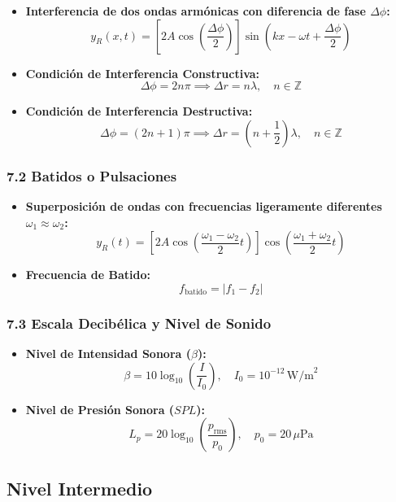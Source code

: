 \documentclass[11pt,a4paper]{article}
\begin{document}
\begin{itemize}
  \item \textbf{Interferencia de dos ondas armónicas con diferencia de fase $\Delta\phi$:}
  \[
    y_R(x, t) = \left[ 2A \cos\left(\frac{\Delta\phi}{2}\right) \right] \sin\left(kx - \omega t + \frac{\Delta\phi}{2}\right)
  \]
  \item \textbf{Condición de Interferencia Constructiva:}
  \[
    \Delta\phi = 2n\pi \implies \Delta r = n\lambda, \quad n \in \mathbb{Z}
  \]
  \item \textbf{Condición de Interferencia Destructiva:}
  \[
    \Delta\phi = (2n + 1)\pi \implies \Delta r = \left(n + \frac{1}{2}\right)\lambda, \quad n \in \mathbb{Z}
  \]
\end{itemize}

\subsubsection*{7.2 Batidos o Pulsaciones}

\begin{itemize}
  \item \textbf{Superposición de ondas con frecuencias ligeramente diferentes $\omega_1 \approx \omega_2$:}
  \[
    y_R(t) = \left[ 2A \cos\left( \frac{\omega_1 - \omega_2}{2} t \right) \right] \cos\left( \frac{\omega_1 + \omega_2}{2} t \right)
  \]
  \item \textbf{Frecuencia de Batido:}
  \[
    f_{\text{batido}} = |f_1 - f_2|
  \]
\end{itemize}

\subsubsection*{7.3 Escala Decibélica y Nivel de Sonido}

\begin{itemize}
  \item \textbf{Nivel de Intensidad Sonora ($\beta$):}
  \[
    \beta = 10 \log_{10}\left( \frac{I}{I_0} \right), \quad I_0 = 10^{-12} \, \text{W/m}^2
  \]
  \item \textbf{Nivel de Presión Sonora ($SPL$):}
  \[
    L_p = 20 \log_{10}\left( \frac{p_{\text{rms}}}{p_0} \right), \quad p_0 = 20 \, \mu\text{Pa}
  \]
\end{itemize}

\subsection*{Nivel Intermedio}
\end{document}
